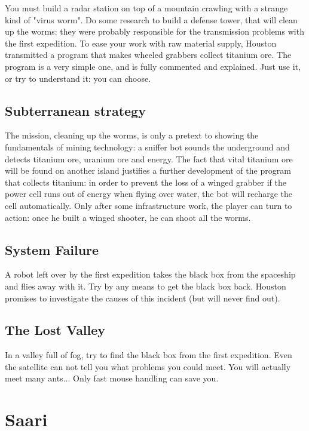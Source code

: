 You must build a radar station on top of a mountain crawling with a strange kind of "virus worm". Do some research to build a defense tower, that will clean up the worms: they were probably responsible for the transmission problems with the first expedition. To ease your work with raw material supply, Houston transmitted a program that makes wheeled grabbers collect titanium ore. The program is a very simple one, and is fully commented and explained. Just use it, or try to understand it: you can choose.


\subsection{Subterranean strategy}

The mission, cleaning up the worms, is only a pretext to showing the fundamentals of mining technology: a sniffer bot sounds the underground and detects titanium ore, uranium ore and energy. The fact that vital titanium ore will be found on another island justifies a further development of the program that collects titanium: in order to prevent the loss of a winged grabber if the power cell runs out of energy when flying over water, the bot will recharge the cell automatically. Only after some infrastructure work, the player can turn to action: once he built a winged shooter, he can shoot all the worms.


\subsection{System Failure}

A robot left over by the first expedition takes the black box from the spaceship and flies away with it. Try by any means to get the black box back. Houston promises to investigate the causes of this incident (but will never find out).


\subsection{The Lost Valley}

In a valley full of fog, try to find the black box from the first expedition. Even the satellite can not tell you what problems you could meet. You will actually meet many ants... Only fast mouse handling can save you.


\newpage
\section{Saari}

